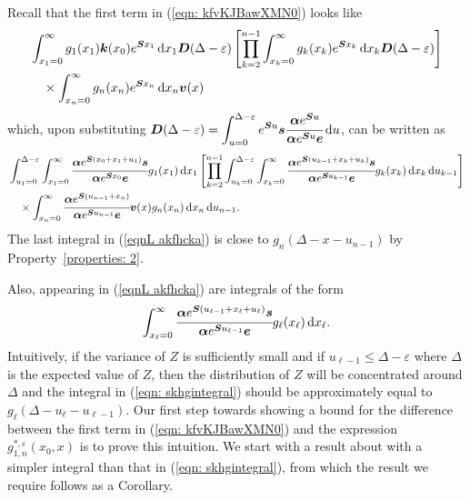 	Recall that the first term in (\ref{eqn: kfvKJBawXMN0}) looks like 
	\begin{align}
		&\int_{x_1=0}^\infty g_1(x_1) \boldsymbol k(x_0)e^{\boldsymbol{S}x_1}\, \mathrm{d} x_1\boldsymbol D(\Delta-\varepsilon)
				\left[\prod_{k=2}^{n-1}\int_{x_k=0}^\infty g_k(x_k) e^{\boldsymbol{S}x_k} \, \mathrm{d} x_k \boldsymbol D(\Delta-\varepsilon)\right] \nonumber 
				\\&\quad \times\int_{x_n=0}^\infty g_{n}(x_n) e^{\boldsymbol{S}x_n} \, \mathrm{d} x_n {\boldsymbol v}(x)  
	\end{align}
	which, upon substituting \(\boldsymbol D(\Delta-\varepsilon)=\displaystyle \int_{u=0}^{\Delta-\varepsilon}e^{\boldsymbol Su}\boldsymbol s\cfrac{\boldsymbol \alpha e^{\boldsymbol Su}}{\boldsymbol \alpha e^{\boldsymbol Su}\boldsymbol e}\, \mathrm{d} u \), can be written as 
	\begin{align}
		& \int_{u_1=0}^{\Delta-\varepsilon} \int_{x_1=0}^\infty \cfrac{\boldsymbol \alpha e^{\boldsymbol{S}(x_{0}+x_1+u_1)}\boldsymbol s}{\boldsymbol \alpha e^{\boldsymbol{S}x_0}\boldsymbol e}g_1(x_1) \, \mathrm{d} x_1 \nonumber 
		\left[\prod_{k=2}^{n-1}\int_{u_k=0}^{\Delta-\varepsilon} \int_{x_k=0}^\infty \cfrac{\boldsymbol \alpha e^{\boldsymbol{S}(u_{k-1}+x_k+u_k)}\boldsymbol s}{\boldsymbol \alpha e^{\boldsymbol{S}u_{k-1}}\boldsymbol e}g_k(x_k) \, \mathrm{d} x_k \, \mathrm{d} u_{k-1} \right]
            	\\&{}\quad\times\int_{x_n=0}^\infty \cfrac{\boldsymbol \alpha e^{\boldsymbol{S}(u_{n-1}+x_n )}}{\boldsymbol \alpha e^{\boldsymbol{S}u_{n-1}}\boldsymbol e} {\boldsymbol v}(x)g_{n}(x_n)\, \mathrm{d} x_n \, \mathrm{d} u_{n-1} .\label{eqnL akfhcka}
	\end{align}
	The last integral in (\ref{eqnL akfhcka}) is close to \(g_n(\Delta - x-u_{n-1})\) by Property~\ref{properties: 2}.

	Also, appearing in (\ref{eqnL akfhcka}) are integrals of the form
	\begin{align}
		\int_{x_\ell=0}^\infty \cfrac{\boldsymbol \alpha e^{\boldsymbol{S}(u_{\ell-1}+x_\ell+u_\ell)}\boldsymbol s}{\boldsymbol \alpha e^{\boldsymbol{S}u_{\ell-1}}\boldsymbol e}g_\ell(x_\ell) \, \mathrm{d} x_\ell. \label{eqn: skhgintegral}
	\end{align}
	Intuitively, if the variance of \(Z\) is sufficiently small and if \(u_{\ell-1}\leq \Delta -\varepsilon\) where \(\Delta\) is the expected value of \(Z\), then the distribution of \(Z\) will be concentrated around \(\Delta\) and the integral in (\ref{eqn: skhgintegral}) should be approximately equal to \(g_{\ell}(\Delta - u_{\ell}-u_{\ell-1})\). Our first step towards showing a bound for the difference between the first term in (\ref{eqn: kfvKJBawXMN0}) and the expression \(g^{*,\varepsilon}_{1,n}(x_0,x)\) is to prove this intuition. We start with a result about with a simpler integral than that in (\ref{eqn: skhgintegral}), from which the result we require follows as a Corollary. 

